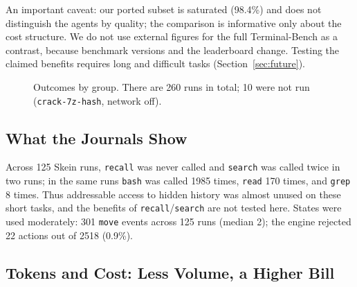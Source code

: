 \documentclass[11pt,a4paper]{article}
\begin{document}
An important caveat: our ported subset is saturated (98.4\%) and does not distinguish the
agents by quality; the comparison is informative only about the cost structure. We do not use
external figures for the full Terminal-Bench as a contrast, because benchmark versions and the
leaderboard change. Testing the claimed benefits requires long and difficult tasks
(Section~\ref{sec:future}).

\begin{figure}[t]
\centering
{}
\caption{Outcomes by group. There are 260 runs in total; 10 were not run
(\texttt{crack-7z-hash}, network off).}
\label{fig:solved}
\end{figure}

\subsection{What the Journals Show}

Across 125 Skein runs, \texttt{recall} was never called and \texttt{search} was called twice in
two runs; in the same runs \texttt{bash} was called 1985 times, \texttt{read} 170 times, and
\texttt{grep} 8 times. Thus addressable access to hidden history was almost unused on these
short tasks, and the benefits of \texttt{recall}/\texttt{search} are not tested here. States
were used moderately: 301 \texttt{move} events across 125 runs (median 2); the engine rejected 22
actions out of 2518 (0.9\%).

\subsection{Tokens and Cost: Less Volume, a Higher Bill}
\end{document}
